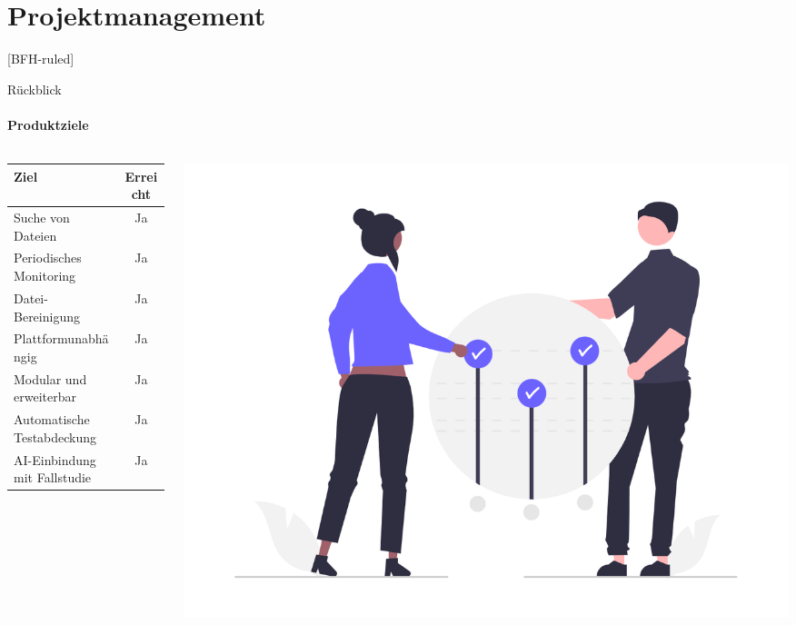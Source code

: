 \documentclass[
    ngerman,%
    authorontitle=true,
]{bfhbeamer}
\begin{document}
    \section{Projektmanagement}\label{sec:projektmanagement}
    [BFH-ruled]
    \frame{\sectionpage}

    \begin{frame}{Rückblick}
        \framesubtitle{Produktziele}
        \begin{columns}
            \begin{column}{0.5\textwidth}
                \begin{tabular}{l|c}
                    \textbf{Ziel}                & \textbf{Erreicht} \\
                    \hline
                    Suche von Dateien            & Ja                \\
                    Periodisches Monitoring      & Ja                \\
                    Datei-Bereinigung            & Ja                \\
                    Plattformunabhängig          & Ja                \\
                    Modular und erweiterbar      & Ja                \\
                    Automatische Testabdeckung   & Ja                \\
                    AI-Einbindung mit Fallstudie & Ja                \\
                \end{tabular}\par
            \end{column}
            \begin{column}{0.5\textwidth}
                \includegraphics[width=1\textwidth]{assets/presentation/goals}
            \end{column}
        \end{columns}
    \end{frame}
\end{document}
